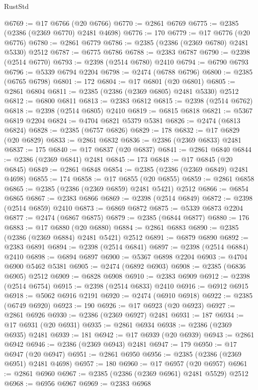 \begin{lexlean}{RustStd}
\begin{coremodule}
@6769 := @17 @6766 (@20 @6766)
@6770 := @2861 @6769
@6775 := @2385 (@2386 (@2369 @6770) @2481 @4698)
@6776 := 170
@6779 := @17 @6776 (@20 @6776)
@6780 := @2861 @6779
@6786 := @2385 (@2386 (@2369 @6780) @2481 @5330) @2512
@6787 := @6775 @6786
@6788 := @2383 @6787
@6790 := @2398 (@2514 @6770)
@6793 := @2398 (@2514 @6780) @2410
@6794 := @6790 @6793
@6796 := @5339 @6794 @2204
@6798 := @2474 (@6788 @6796)
@6800 := @2385 (@6765 @6798)
@6801 := 172
@6804 := @17 @6801 (@20 @6801)
@6805 := @2861 @6804
@6811 := @2385 (@2386 (@2369 @6805) @2481 @5330) @2512
@6812 := @6800 @6811
@6813 := @2383 @6812
@6815 := @2398 (@2514 @6762)
@6818 := @2398 (@2514 @6805) @2410
@6819 := @6815 @6818
@6821 := @5367 @6819 @2204
@6824 := @4704 @6821 @5379 @5381
@6826 := @2474 (@6813 @6824)
@6828 := @2385 (@6757 @6826)
@6829 := 178
@6832 := @17 @6829 (@20 @6829)
@6833 := @2861 @6832
@6836 := @2386 (@2369 @6833) @2481
@6837 := 175
@6840 := @17 @6837 (@20 @6837)
@6841 := @2861 @6840
@6844 := @2386 (@2369 @6841) @2481
@6845 := 173
@6848 := @17 @6845 (@20 @6845)
@6849 := @2861 @6848
@6854 := @2385 (@2386 (@2369 @6849) @2481 @4698)
@6855 := 174
@6858 := @17 @6855 (@20 @6855)
@6859 := @2861 @6858
@6865 := @2385 (@2386 (@2369 @6859) @2481 @5421) @2512
@6866 := @6854 @6865
@6867 := @2383 @6866
@6869 := @2398 (@2514 @6849)
@6872 := @2398 (@2514 @6859) @2410
@6873 := @6869 @6872
@6875 := @5339 @6873 @2204
@6877 := @2474 (@6867 @6875)
@6879 := @2385 (@6844 @6877)
@6880 := 176
@6883 := @17 @6880 (@20 @6880)
@6884 := @2861 @6883
@6890 := @2385 (@2386 (@2369 @6884) @2481 @5421) @2512
@6891 := @6879 @6890
@6892 := @2383 @6891
@6894 := @2398 (@2514 @6841)
@6897 := @2398 (@2514 @6884) @2410
@6898 := @6894 @6897
@6900 := @5367 @6898 @2204
@6903 := @4704 @6900 @5462 @5381
@6905 := @2474 (@6892 @6903)
@6908 := @2385 (@6836 @6905) @2512
@6909 := @6828 @6908
@6910 := @2383 @6909
@6912 := @2398 (@2514 @6754)
@6915 := @2398 (@2514 @6833) @2410
@6916 := @6912 @6915
@6918 := @5062 @6916 @2191
@6920 := @2474 (@6910 @6918)
@6922 := @2385 (@6749 @6920)
@6923 := 190
@6926 := @17 @6923 (@20 @6923)
@6927 := @2861 @6926
@6930 := @2386 (@2369 @6927) @2481
@6931 := 187
@6934 := @17 @6931 (@20 @6931)
@6935 := @2861 @6934
@6938 := @2386 (@2369 @6935) @2481
@6939 := 181
@6942 := @17 @6939 (@20 @6939)
@6943 := @2861 @6942
@6946 := @2386 (@2369 @6943) @2481
@6947 := 179
@6950 := @17 @6947 (@20 @6947)
@6951 := @2861 @6950
@6956 := @2385 (@2386 (@2369 @6951) @2481 @4698)
@6957 := 180
@6960 := @17 @6957 (@20 @6957)
@6961 := @2861 @6960
@6967 := @2385 (@2386 (@2369 @6961) @2481 @5529) @2512
@6968 := @6956 @6967
@6969 := @2383 @6968

\end{coremodule}
\end{lexlean}

